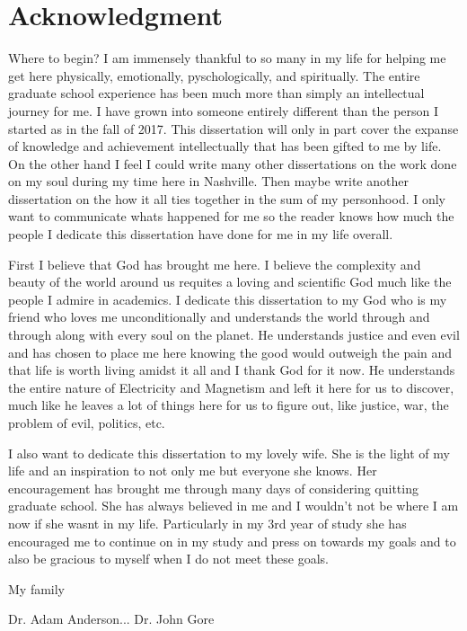 
\chapter*{Acknowledgment}\label{acknowledgment}
\vspace{7mm}

Where to begin? I am immensely thankful to so many in my life for helping me get here physically, emotionally, pyschologically, and spiritually. 
The entire graduate school experience has been much more than simply an intellectual journey for me. I have grown into someone entirely different than the person I started as in the fall of 2017. 
This dissertation will only in part cover the expanse of knowledge and achievement intellectually that has been gifted to me by life. 
On the other hand I feel I could write many other dissertations on the work done on my soul during my time here in Nashville. 
Then maybe write another dissertation on the how it all ties together in the sum of my personhood. 
I only want to communicate whats happened for me so the reader knows how much the people I dedicate this dissertation have done for me in my life overall.  

First I believe that God has brought me here. I believe the complexity and beauty of the world around us requites a loving and scientific God much like the people I admire in academics. 
I dedicate this dissertation to my God who is my friend who loves me unconditionally and understands the world through and through along with every soul on the planet. 
He understands justice and even evil and has chosen to place me here knowing the good would outweigh the pain and that life is worth living amidst it all and I thank God for it now.
He understands the entire nature of Electricity and Magnetism and left it here for us to discover, much like he leaves a lot of things here for us to figure out, like justice, war, the problem of evil, politics, etc.

I also want to dedicate this dissertation to my lovely wife. She is the light of my life and an inspiration to not only me but everyone she knows. Her encouragement has brought me through many days of considering quitting
graduate school. She has always believed in me and I wouldn't not be where I am now if she wasnt in my life. Particularly in my 3rd year of study she has encouraged me to continue on in my study and press on towards my goals
and to also be gracious to myself when I do not meet these goals.

My family 

Dr. Adam Anderson...
Dr. John Gore
